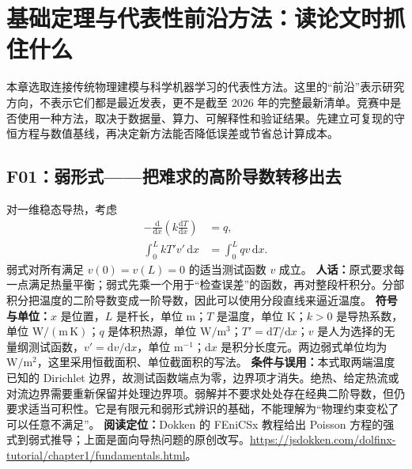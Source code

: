 \chapter{基础定理与代表性前沿方法：读论文时抓住什么}
本章选取连接传统物理建模与科学机器学习的代表性方法。这里的“前沿”表示研究方向，不表示它们都是最近发表，更不是截至 2026 年的完整最新清单。竞赛中是否使用一种方法，取决于数据量、算力、可解释性和验证结果。先建立可复现的守恒方程与数值基线，再决定新方法能否降低误差或节省总计算成本。

\section{F01：弱形式——把难求的高阶导数转移出去}
对一维稳态导热，考虑
\begin{equation}
 \begin{aligned}
 -\frac{\mathrm d}{\mathrm dx}\!\left(k\frac{\mathrm dT}{\mathrm dx}\right)&=q,\\
 \int_0^L kT'v'\,\mathrm dx&=\int_0^L qv\,\mathrm dx.
 \end{aligned}
\end{equation}
弱式对所有满足 $v(0)=v(L)=0$ 的适当测试函数 $v$ 成立。
\textbf{人话：}原式要求每一点满足热量平衡；弱式先乘一个用于“检查误差”的函数，再对整段杆积分。分部积分把温度的二阶导数变成一阶导数，因此可以使用分段直线来逼近温度。
\textbf{符号与单位：}$x$ 是位置，$L$ 是杆长，单位 m；$T$ 是温度，单位 K；$k>0$ 是导热系数，单位 $\mathrm{W/(m\,K)}$；$q$ 是体积热源，单位 $\mathrm{W/m^3}$；$T'=\mathrm dT/\mathrm dx$；$v$ 是人为选择的无量纲测试函数，$v'=\mathrm dv/\mathrm dx$，单位 $\mathrm m^{-1}$；$\mathrm dx$ 是积分长度元。两边弱式单位均为 $\mathrm{W/m^2}$，这里采用恒截面积、单位截面积的写法。
\textbf{条件与误用：}本式取两端温度已知的 Dirichlet 边界，故测试函数端点为零，边界项才消失。绝热、给定热流或对流边界需要重新保留并处理边界项。弱解并不要求处处存在经典二阶导数，但仍要求适当可积性。它是有限元和弱形式辨识的基础，不能理解为“物理约束变松了可以任意不满足”。
\textbf{阅读定位：}Dokken 的 FEniCSx 教程给出 Poisson 方程的强式到弱式推导；上面是面向导热问题的原创改写。\url{https://jsdokken.com/dolfinx-tutorial/chapter1/fundamentals.html}。


